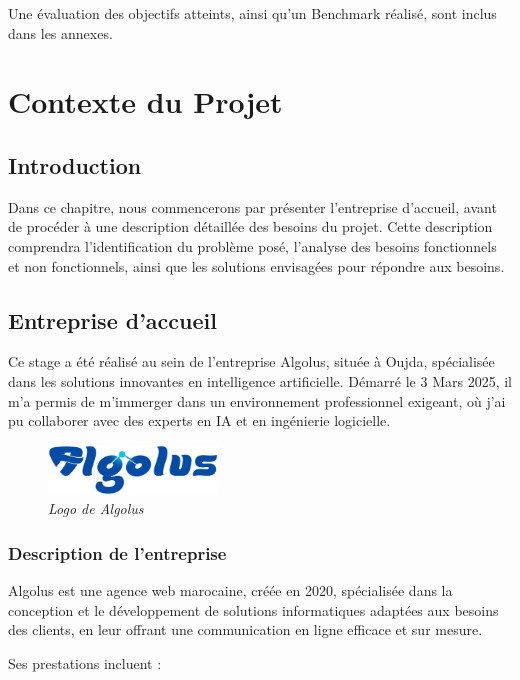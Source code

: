 \documentclass[12pt,a4paper]{report}
\begin{document}
	Une évaluation des objectifs atteints, ainsi qu'un Benchmark réalisé, sont inclus dans les annexes.
	
	\chapter{Contexte du Projet}
	
	\section{Introduction}
	
	Dans ce chapitre, nous commencerons par présenter l’entreprise d’accueil, avant de procéder à une description détaillée des besoins du projet. Cette description comprendra l’identification du problème posé, l’analyse des besoins fonctionnels et non fonctionnels, ainsi que les solutions envisagées pour répondre aux besoins.
	
	\section{Entreprise d’accueil}
	
	Ce stage a été réalisé au sein de l’entreprise Algolus, située à Oujda, spécialisée dans les solutions innovantes en intelligence artificielle. Démarré le 3 Mars 2025, il m’a permis de m’immerger dans un environnement professionnel exigeant, où j’ai pu collaborer avec des experts en IA et en ingénierie logicielle.
	
	\begin{figure}[H]
		\centering
		\includegraphics[width=0.4\textwidth]{algolus-logo.png}
		\caption{\textit{Logo de Algolus}}
		\label{fig:algolus-logo}
	\end{figure}
	
	\subsection{Description de l’entreprise}
	
	Algolus est une agence web marocaine, créée en 2020, spécialisée dans la conception et le développement de solutions informatiques adaptées aux besoins des clients, en leur offrant une communication en ligne efficace et sur mesure.
	
	Ses prestations incluent :
	
\end{document}
